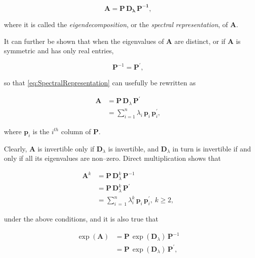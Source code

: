 \documentclass[graybox,envcountchap,sectrefs]{svmono}\usepackage[]{graphicx}\usepackage[]{xcolor}
\begin{document}
\begin{appendices}
\begin{equation}
\mathbf{\mathbf{A}=\mathbf{P}\,\mathbf{D}_{\lambda}\,\mathbf{P}^{-1}},\label{eq:SpectralRepresentation}
\end{equation}

where it is called the \emph{eigendecomposition}, or the \emph{spectral}
\emph{representation}, of $\mathrm{\mathbf{A}}$. 

It can further be shown that when the eigenvalues of $\mathbf{A}$
are distinct, or if $\mathbf{A}$ is symmetric and has only real entries, 

\[
\mathbf{P}^{-1}=\mathbf{P}^{\prime},
\]

so that \eqref{eq:SpectralRepresentation} can usefully be rewritten
as

\begin{align}
\mathbf{\mathbf{A}} & =\mathbf{P}\,\mathbf{D}_{\lambda}\,\mathbf{P}^{\prime}\nonumber \\
 & =\sum_{i=1}^{n}\lambda_{i}\,\mathrm{\mathbf{p}}_{i}\,\mathrm{\mathbf{p}}_{i}^{\prime},\label{eq:SpectralRepresentation1}
\end{align}

where $\mathrm{\mathbf{p}}_{i}$ is the $i^{th}$ column of $\mathbf{P}$. 

Clearly, $\mathrm{\mathbf{A}}$ is invertible only if $\mathbf{D}_{\lambda}$
is invertible, and $\mathbf{D}_{\lambda}$ in turn is invertible if
and only if all its eigenvalues are non--zero. Direct multiplication
shows that

\begin{align}
\mathrm{\mathbf{A}}^{k} & =\mathbf{P}\,\mathbf{D}_{\lambda}^{k}\,\mathbf{P}^{-1}\nonumber \\
 & =\mathbf{P}\,\mathbf{D}_{\lambda}^{k}\,\mathbf{P}^{\prime}\nonumber \\
 & =\sum_{i\,=\,1}^{n}\lambda_{i}^{k}\,\mathrm{\mathbf{p}}_{i}\,\mathrm{\mathbf{p}}_{i}^{\prime},\ k\geqslant2,\label{eq:SpectralRepresentationOfPowers}
\end{align}

under the above conditions, and it is also true that

\begin{align}
\exp\left(\mathrm{\mathbf{A}}\right) & =\mathbf{P}\,\exp\left(\mathbf{D}_{\lambda}\right)\,\mathbf{P}^{-1}\nonumber \\
 & =\mathbf{P}\,\exp\left(\mathbf{D}_{\lambda}\right)\,\mathbf{P}^{\prime},\label{eq:SpectralRepresentationOfExpA}
\end{align}


\end{appendices}
\end{document}
